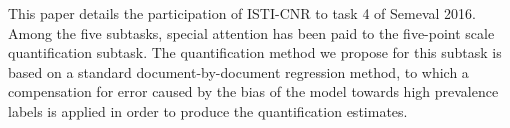 This paper details the participation of ISTI-CNR to task 4 of Semeval 2016. Among the five subtasks, special attention has been paid to the five-point scale quantification subtask. The quantification method we propose for this subtask is based on a standard document-by-document regression method, to which a compensation for error caused by the bias of the model towards high prevalence labels is applied in order to produce the quantification estimates.
